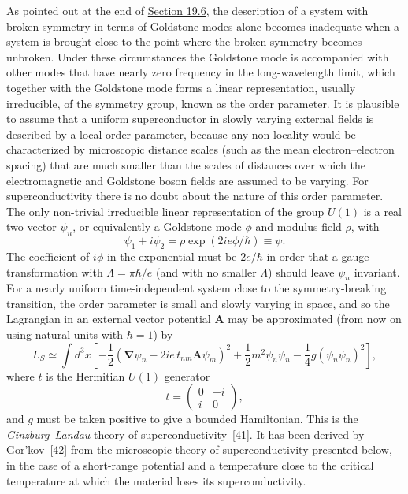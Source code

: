 As pointed out at the end of \hyperref[sec:19.6]{Section 19.6}, the description of a system with broken symmetry in terms of Goldstone modes alone becomes inadequate when a system is brought close to the point where the broken symmetry becomes unbroken. Under these circumstances the Goldstone mode is accompanied with other modes that have nearly zero frequency in the long-wavelength limit, which together with the Goldstone mode forms a linear representation, usually irreducible, of the symmetry group, known as the order parameter. It is plausible to assume that a uniform superconductor in slowly varying external fields is described by a local order parameter, because any non-locality would be characterized by microscopic distance scales (such as the mean electron--electron spacing) that are much smaller than the scales of distances over which the electromagnetic and Goldstone boson fields are assumed to be varying. For superconductivity there is no doubt about the nature of this order parameter. The only non-trivial irreducible linear representation of the group $U(1)$ is a real two-vector $\psi_n$, or equivalently a Goldstone mode $\phi$ and modulus field $\rho$, with
\begin{equation}
\psi_1+i\psi_2=\rho\exp(2ie\phi/\hbar)\equiv\psi.
\tag{21.6.20}\label{eq:21.6.20}
\end{equation}
The coefficient of $i\phi$ in the exponential must be $2e/\hbar$ in order that a gauge transformation with $\Lambda=\pi\hbar/e$ (and with no smaller $\Lambda$) should leave $\psi_n$ invariant. For a nearly uniform time-independent system close to the symmetry-breaking transition, the order parameter is small and slowly varying in space, and so the Lagrangian in an external vector potential $\mathbf A$ may be approximated (from now on using natural units with $\hbar=1$) by
\begin{equation}
L_S\simeq\int d^3x\left[
-\frac12\left(
\boldsymbol\nabla\psi_n-2ie\,t_{nm}\mathbf A\psi_m
\right)^2
+\frac12m^2\psi_n\psi_n
-\frac14g(\psi_n\psi_n)^2
\right],
\tag{21.6.21}\label{eq:21.6.21}
\end{equation}
where $t$ is the Hermitian $U(1)$ generator
\[
t=\begin{pmatrix}
0&-i\\
i&0
\end{pmatrix},
\]
and $g$ must be taken positive to give a bounded Hamiltonian. This is the \emph{Ginzburg--Landau} theory of superconductivity~\hyperref[ch21-ref-41]{[41]}. It has been derived by Gor'kov~\hyperref[ch21-ref-42]{[42]} from the microscopic theory of superconductivity presented below, in the case of a short-range potential and a temperature close to the critical temperature at which the material loses its superconductivity.

